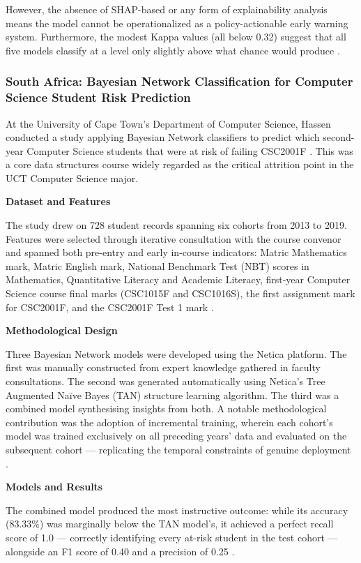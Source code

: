 \documentclass[12pt]{report}
\begin{document}
However, the absence of SHAP-based or any form of explainability analysis means the model cannot be operationalized as a policy-actionable early warning system. Furthermore, the modest Kappa values (all below 0.32) suggest that all five models classify at a level only slightly above what chance would produce \parencite{taodzera2016}.

\subsubsection{South Africa: Bayesian Network Classification for Computer Science Student Risk Prediction}

At the University of Cape Town's Department of Computer Science, Hassen conducted a study applying Bayesian Network classifiers to predict which second-year Computer Science students that were at risk of failing CSC2001F \parencite{hassen2020}. This was a core data structures course widely regarded as the critical attrition point in the UCT Computer Science major.

\textbf{Dataset and Features}

The study drew on 728 student records spanning six cohorts from 2013 to 2019. Features were selected through iterative consultation with the course convenor and spanned both pre-entry and early in-course indicators: Matric Mathematics mark, Matric English mark, National Benchmark Test (NBT) scores in Mathematics, Quantitative Literacy and Academic Literacy, first-year Computer Science course final marks (CSC1015F and CSC1016S), the first assignment mark for CSC2001F, and the CSC2001F Test 1 mark \parencite{hassen2020}.

\textbf{Methodological Design}

Three Bayesian Network models were developed using the Netica platform. The first was manually constructed from expert knowledge gathered in faculty consultations. The second was generated automatically using Netica's Tree Augmented Na\"{i}ve Bayes (TAN) structure learning algorithm. The third was a combined model synthesising insights from both. A notable methodological contribution was the adoption of incremental training, wherein each cohort's model was trained exclusively on all preceding years' data and evaluated on the subsequent cohort --- replicating the temporal constraints of genuine deployment \parencite{hassen2020}.

\textbf{Models and Results}

The combined model produced the most instructive outcome: while its accuracy (83.33\%) was marginally below the TAN model's, it achieved a perfect recall score of 1.0 --- correctly identifying every at-risk student in the test cohort --- alongside an F1 score of 0.40 and a precision of 0.25 \parencite{hassen2020}.
\end{document}
